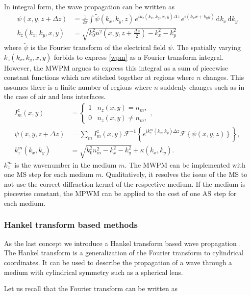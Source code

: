 \documentclass[a4paper,12pt]{article}
\begin{document}
In integral form, the wave propagation can be written as
\begin{align}
\label{wpm}
    \psi(x,y,z+\Delta z) &= \frac{1}{2\pi} \int \widetilde{\psi}(k_x, k_y, z) \, e^{ik_z(k_x, k_y, x, y) \Delta z} \, e^{i (k_x x + k_y y)} \, \mathrm{d}k_x \, \mathrm{d}k_y\\
    k_z(k_x, k_y, x, y) &= \sqrt{k_0^2 n^2 \left( x,y,z + \frac{\Delta z}{2} \right) - k_x^2 - k_y^2}
\end{align}
where $\widetilde{\psi}$ is the Fourier transform of the electrical field $\psi$.
The spatially varying $k_z(k_x, k_y, x, y)$ forbids to express \autoref{wpm} as a Fourier transform integral.
However, the MWPM argues to express this integral as a sum of piecewise constant functions which are stitched together at regions where $n$ changes.
This assumes there is a finite number of regions where $n$ suddenly changes such as in the case of air and lens interfaces.
\begin{align}
    I_m^z(x,y) &=
    \begin{cases}
    1 & n_z(x,y) = n_m, \\
    0 & n_z(x,y) \ne n_m,
    \end{cases}, \\
    \psi(x,y,z+\Delta z) &= \sum_m I_m^z(x,y) \mathcal{F}^{-1} \left\{ e^{i k_z^m(k_x,k_y)\Delta z} \mathcal{F} \left\{\psi(x,y,z) \right\} \right\},\\
    k_z^m(k_x, k_y) &= \sqrt{k_0^2 n_m^2 - k_x^2 - k_y^2} + \kappa(k_x, k_y).
\end{align}
$k_z^m$ is the wavenumber in the medium $m$.
The MWPM can be implemented with one MS step for each medium $m$.
Qualitatively, it resolves the issue of the MS to not use the correct diffraction kernel of the respective medium. If the medium is piecewise constant, the MPWM can be applied to the cost of one AS step for each medium.

\subsubsection{Hankel transform based methods}
As the last concept we introduce a Hankel transform based wave propagation \cite{Guizar-Sicairos_Gutiérrez-Vega_2004}.
The Hankel transform is a generalization of the Fourier transform to cylindrical coordinates. It can be used to describe the propagation of a wave through a medium with cylindrical symmetry such as a spherical lens.

Let us recall that the Fourier transform can be written as
\end{document}
